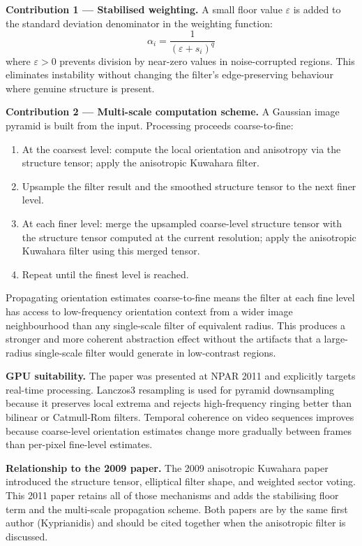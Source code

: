 \documentclass[11pt, a4paper]{article}
\begin{document}
\textbf{Contribution 1 --- Stabilised weighting.} A small floor value $\varepsilon$ is added to the standard deviation denominator in the weighting function:
\[
  \alpha_i = \frac{1}{(\varepsilon + s_i)^q}
\]
where $\varepsilon > 0$ prevents division by near-zero values in noise-corrupted regions. This eliminates instability without changing the filter's edge-preserving behaviour where genuine structure is present.

\textbf{Contribution 2 --- Multi-scale computation scheme.} A Gaussian image pyramid is built from the input. Processing proceeds coarse-to-fine:
\begin{enumerate}[leftmargin=2.5em]
  \item At the coarsest level: compute the local orientation and anisotropy via the structure tensor; apply the anisotropic Kuwahara filter.
  \item Upsample the filter result and the smoothed structure tensor to the next finer level.
  \item At each finer level: merge the upsampled coarse-level structure tensor with the structure tensor computed at the current resolution; apply the anisotropic Kuwahara filter using this merged tensor.
  \item Repeat until the finest level is reached.
\end{enumerate}

Propagating orientation estimates coarse-to-fine means the filter at each fine level has access to low-frequency orientation context from a wider image neighbourhood than any single-scale filter of equivalent radius. This produces a stronger and more coherent abstraction effect without the artifacts that a large-radius single-scale filter would generate in low-contrast regions.

\textbf{GPU suitability.} The paper was presented at NPAR 2011 and explicitly targets real-time processing. Lanczos3 resampling is used for pyramid downsampling because it preserves local extrema and rejects high-frequency ringing better than bilinear or Catmull-Rom filters. Temporal coherence on video sequences improves because coarse-level orientation estimates change more gradually between frames than per-pixel fine-level estimates.

\textbf{Relationship to the 2009 paper.} The 2009 anisotropic Kuwahara paper introduced the structure tensor, elliptical filter shape, and weighted sector voting. This 2011 paper retains all of those mechanisms and adds the stabilising floor term and the multi-scale propagation scheme. Both papers are by the same first author (Kyprianidis) and should be cited together when the anisotropic filter is discussed.
\end{document}
